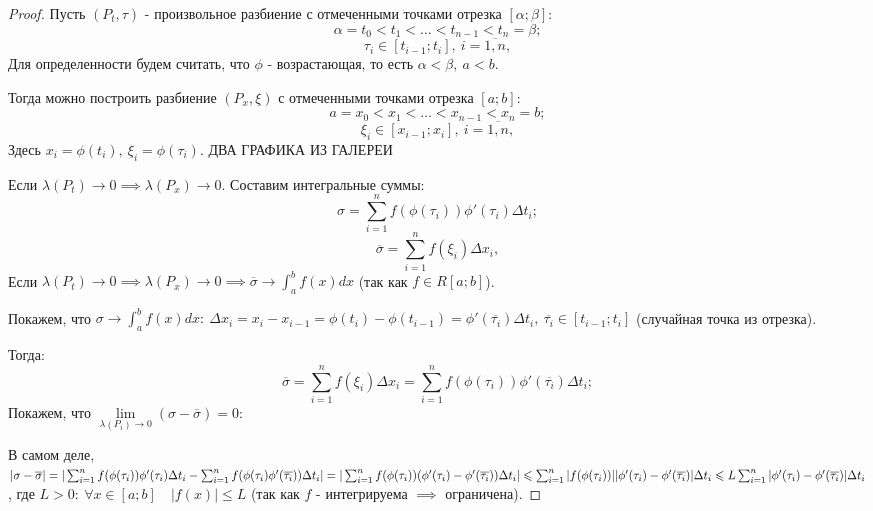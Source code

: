 \documentclass{report}
\theoremstyle{definition}
\begin{document}
\begin{proof}
  Пусть $(P_t,\tau)$ - произвольное разбиение с отмеченными точками отрезка $[\alpha;\beta]:$
  \begin{equation*}
    \alpha = t_0 < t_1 < \ldots < t_{n-1} < t_n = \beta;
  \end{equation*}
  \begin{equation*}
    \tau_i \in [t_{i-1};t_i], \ i = \overline{1,n},
  \end{equation*}
  Для определенности будем считать, что $\phi$ - возрастающая, то есть $\alpha < \beta, \ a < b$.

  Тогда можно построить разбиение $(P_x,\xi)$ с отмеченными точками отрезка $[a;b]:$
  \begin{equation*}
    a = x_0 < x_1 < \ldots < x_{n-1} < x_n = b;
  \end{equation*}
  \begin{equation*}
    \xi_i \in [x_{i-1};x_i], \ i = \overline{1,n},
  \end{equation*}
  Здесь $x_i = \phi(t_i), \ \xi_i = \phi(\tau_i)$.
  {\Large ДВА ГРАФИКА ИЗ ГАЛЕРЕИ}

  Если $\lambda(P_t)\rightarrow0 \implies \lambda(P_x)\rightarrow0$. Составим интегральные суммы:
  \begin{equation*}
    \sigma = \sum_{i=1}^{n}f(\phi(\tau_i))\phi'(\tau_i)\Delta t_i;
  \end{equation*}
  \begin{equation*}
    \overline{\sigma} = \sum_{i=1}^{n}f(\xi_i)\Delta x_i,
  \end{equation*}
  Если $\lambda(P_t)\rightarrow0 \implies \lambda(P_x) \rightarrow 0 \implies \overline{\sigma}
  \rightarrow \int_{a}^{b}f(x)dx$ (так как $f\in R[a;b]$).

  Покажем, что $\sigma \rightarrow \int_{a}^{b}f(x)dx: \ \Delta x_i = x_i - x_{i-1} = \phi(t_i)
  - \phi (t_{i-1}) = \phi'(\overline{\tau_i})\Delta t_i, \ \overline{\tau_i} \in [t_{i-1};t_i]$
  (случайная точка из отрезка).

  Тогда:
  \begin{equation*}
    \overline{\sigma} = \sum_{i=1}^{n}f(\xi_i)\Delta x_i = \sum_{i=1}^{n}f(\phi(\tau_i))
    \phi'(\overline{\tau_i})\Delta t_i;
  \end{equation*}
  Покажем, что $\underset{\lambda(P_i)\rightarrow0}{\lim}(\sigma - \overline{\sigma}) = 0:$

  В самом деле, $| \sigma - \overline{\sigma} | = | \sum_{i=1}^{n} f(\phi(\tau_i))\phi'(\tau_i)
  \Delta t_i - \sum_{i=1}^{n}f(\phi(\tau_i)\phi'(\overline{\tau_i}))\Delta t_i | = 
  | \sum_{i=1}^{n}f(\phi(\tau_i))(\phi'(\tau_i) - \phi'(\overline{\tau_i}))\Delta t_i | \leqslant
  \sum_{i=1}^{n}| f(\phi(\tau_i)) | | \phi'(\tau_i) - \phi'(\overline{\tau_i}) |\Delta t_i \leqslant
  \\ L\sum_{i=1}^{n}| \phi'(\tau_i) - \phi'(\overline{\tau_i}) | \Delta t_i$, где $L>0: \ \forall x
  \in [a;b] \quad |f(x)| \leqslant L$ (так как $f$ - интегрируема $\implies$ ограничена).


\end{proof}
\end{document}
